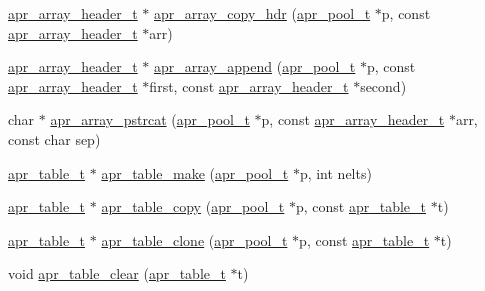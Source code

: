 \begin{DoxyCompactItemize}
\item 
\hyperlink{structapr__array__header__t}{apr\+\_\+array\+\_\+header\+\_\+t} $\ast$ \hyperlink{group__apr__tables_ga6203e9f731bf43e7373857c38d04397d}{apr\+\_\+array\+\_\+copy\+\_\+hdr} (\hyperlink{group__apr__pools_gaf137f28edcf9a086cd6bc36c20d7cdfb}{apr\+\_\+pool\+\_\+t} $\ast$p, const \hyperlink{structapr__array__header__t}{apr\+\_\+array\+\_\+header\+\_\+t} $\ast$arr)
\item 
\hyperlink{structapr__array__header__t}{apr\+\_\+array\+\_\+header\+\_\+t} $\ast$ \hyperlink{group__apr__tables_ga893cade58c5fabecb593cb4ffac7e9be}{apr\+\_\+array\+\_\+append} (\hyperlink{group__apr__pools_gaf137f28edcf9a086cd6bc36c20d7cdfb}{apr\+\_\+pool\+\_\+t} $\ast$p, const \hyperlink{structapr__array__header__t}{apr\+\_\+array\+\_\+header\+\_\+t} $\ast$first, const \hyperlink{structapr__array__header__t}{apr\+\_\+array\+\_\+header\+\_\+t} $\ast$second)
\item 
char $\ast$ \hyperlink{group__apr__tables_ga6232817e4a32ee5619c99fe55e145c7a}{apr\+\_\+array\+\_\+pstrcat} (\hyperlink{group__apr__pools_gaf137f28edcf9a086cd6bc36c20d7cdfb}{apr\+\_\+pool\+\_\+t} $\ast$p, const \hyperlink{structapr__array__header__t}{apr\+\_\+array\+\_\+header\+\_\+t} $\ast$arr, const char sep)
\item 
\hyperlink{group__apr__tables_gad7ea82d6608a4a633fc3775694ab71e4}{apr\+\_\+table\+\_\+t} $\ast$ \hyperlink{group__apr__tables_ga7b0a16a1388c68e66bff32190cf092f6}{apr\+\_\+table\+\_\+make} (\hyperlink{group__apr__pools_gaf137f28edcf9a086cd6bc36c20d7cdfb}{apr\+\_\+pool\+\_\+t} $\ast$p, int nelts)
\item 
\hyperlink{group__apr__tables_gad7ea82d6608a4a633fc3775694ab71e4}{apr\+\_\+table\+\_\+t} $\ast$ \hyperlink{group__apr__tables_gae69f2b0b593bcdbf4c678a0f3dfde5f3}{apr\+\_\+table\+\_\+copy} (\hyperlink{group__apr__pools_gaf137f28edcf9a086cd6bc36c20d7cdfb}{apr\+\_\+pool\+\_\+t} $\ast$p, const \hyperlink{group__apr__tables_gad7ea82d6608a4a633fc3775694ab71e4}{apr\+\_\+table\+\_\+t} $\ast$t)
\item 
\hyperlink{group__apr__tables_gad7ea82d6608a4a633fc3775694ab71e4}{apr\+\_\+table\+\_\+t} $\ast$ \hyperlink{group__apr__tables_ga7e8bc16b272840302545ed4a6a082a6e}{apr\+\_\+table\+\_\+clone} (\hyperlink{group__apr__pools_gaf137f28edcf9a086cd6bc36c20d7cdfb}{apr\+\_\+pool\+\_\+t} $\ast$p, const \hyperlink{group__apr__tables_gad7ea82d6608a4a633fc3775694ab71e4}{apr\+\_\+table\+\_\+t} $\ast$t)
\item 
void \hyperlink{group__apr__tables_ga03f03de545f9a18e25420f261938ffea}{apr\+\_\+table\+\_\+clear} (\hyperlink{group__apr__tables_gad7ea82d6608a4a633fc3775694ab71e4}{apr\+\_\+table\+\_\+t} $\ast$t)

\end{DoxyCompactItemize}
